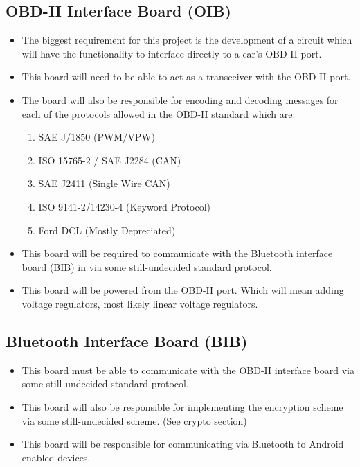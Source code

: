 \documentclass[12pt,letterpaper]{article}
\begin{document}
\subsection {OBD-II Interface Board (OIB)}
\begin{itemize}
	\item The biggest requirement for this project is the development of a circuit which will have the functionality to interface directly to a car's OBD-II port. 
	\item This board will need to be able to act as a transceiver with the OBD-II port. \\
	\item The board will also be responsible for encoding and decoding messages for each of the protocols allowed in the OBD-II standard which are:
	\begin{enumerate}
		\item SAE J/1850 (PWM/VPW)
		\item ISO 15765-2 / SAE J2284 (CAN)
		\item SAE J2411 (Single Wire CAN)
		\item ISO 9141-2/14230-4 (Keyword Protocol)
		\item Ford DCL (Mostly Depreciated) 
	\end{enumerate}
	\item This board will be required to communicate with the Bluetooth interface board (BIB) in via some still-undecided standard protocol.
	\item This board will be powered from the OBD-II port. Which will mean adding voltage regulators, most likely linear voltage regulators.
\end{itemize}

\subsection{Bluetooth Interface Board (BIB)}
\begin{itemize}
	\item This board must be able to communicate with the OBD-II interface board via some still-undecided standard protocol.
	\item This board will also be responsible for implementing the encryption scheme via some still-undecided scheme. (See crypto section)
	\item This board will be responsible for communicating via Bluetooth to Android enabled devices.
\end{itemize}
\end{document}
